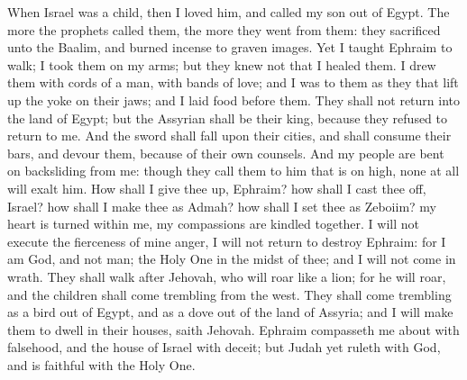 When Israel was a child, then I loved him, and called my son out of Egypt. The more the prophets called them, the more they went from them: they sacrificed unto the Baalim, and burned incense to graven images. Yet I taught Ephraim to walk; I took them on my arms; but they knew not that I healed them. I drew them with cords of a man, with bands of love; and I was to them as they that lift up the yoke on their jaws; and I laid food before them.  They shall not return into the land of Egypt; but the Assyrian shall be their king, because they refused to return to me. And the sword shall fall upon their cities, and shall consume their bars, and devour them, because of their own counsels. And my people are bent on backsliding from me: though they call them to him that is on high, none at all will exalt him.  How shall I give thee up, Ephraim? how shall I cast thee off, Israel? how shall I make thee as Admah? how shall I set thee as Zeboiim? my heart is turned within me, my compassions are kindled together. I will not execute the fierceness of mine anger, I will not return to destroy Ephraim: for I am God, and not man; the Holy One in the midst of thee; and I will not come in wrath. They shall walk after Jehovah, who will roar like a lion; for he will roar, and the children shall come trembling from the west. They shall come trembling as a bird out of Egypt, and as a dove out of the land of Assyria; and I will make them to dwell in their houses, saith Jehovah.  Ephraim compasseth me about with falsehood, and the house of Israel with deceit; but Judah yet ruleth with God, and is faithful with the Holy One. 

